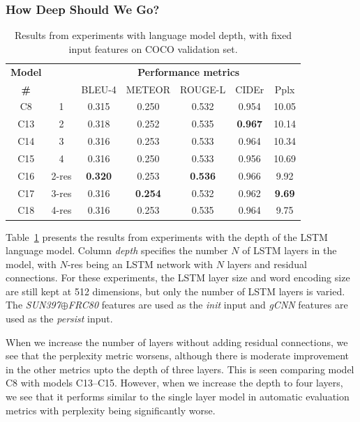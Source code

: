\subsubsection{How Deep Should We Go?}
\label{subsec:exptdepth}
\begin{table}[tbh]
  \centering
  \newcommand{\bs}{\small}
  \begin{adjustbox}{center}
  \begin{tabular}{|c|c|c|c|c|c|c|}
    \hline
    \bf Model & \bf \multirow{2}{*}{Depth} & \multicolumn{5}{c|}{\bf Performance metrics}\\
    \cline{3-7}
    \bf \# &\bf &\bs BLEU-4 &\bs METEOR &\bs ROUGE-L &\bs CIDEr&\bs Pplx \\\hline
    C8  & 1   & 0.315 & 0.250 & 0.532 & 0.954 &10.05  \\\hline
    C13 & 2   & 0.318 & 0.252 & 0.535 &\bf0.967 & 10.14  \\
    C14 & 3   & 0.316 & 0.253 & 0.533 & 0.964   & 10.34  \\
    C15 & 4   & 0.316 & 0.250 & 0.533 & 0.956 & 10.69  \\\hline
    C16 &2-res&\bf0.320& 0.253 &\bf0.536&0.966  & 9.92   \\
    C17 &3-res& 0.316 &\bf0.254&0.532 & 0.962   &\bf9.69 \\
    C18 &4-res& 0.316 & 0.253 & 0.535 & 0.964   & 9.75 \\\hline
  \end{tabular}
  \end{adjustbox}
  \caption{Results from experiments with language model depth, with fixed input features on COCO validation set.}
  \label{tab:resCocDepthExpt}
\end{table}

Table~\ref{tab:resCocDepthExpt} presents the results from experiments with the
depth of the LSTM language model.
Column \emph{depth} specifies the number $N$ of LSTM layers in the model,
with $N$-res being an LSTM network with $N$ layers and residual connections.
For these experiments, the LSTM layer size and word encoding size are still kept
at 512 dimensions, but only the number of LSTM layers is varied.
The \emph{SUN397$\oplus$FRC80} features are used as the \emph{init} input and
\emph{gCNN} features are used as the \emph{persist} input.

When we increase the number of layers without adding residual connections, we
see that the perplexity metric worsens, although there is moderate improvement
in the other metrics upto the depth of three layers.
This is seen comparing model C8 with models C13--C15.
However, when we increase the depth to four layers, we see that it performs similar to
the single layer model in automatic evaluation metrics with perplexity being
significantly worse.

